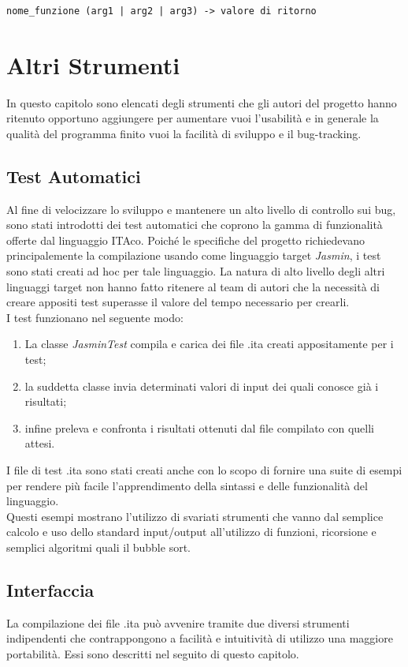 \documentclass[11pt, a4paper, twoside, notitlepage]{report}
\begin{document}
\begin{verbatim}
nome_funzione (arg1 | arg2 | arg3) -> valore di ritorno
\end{verbatim}

\chapter{Altri Strumenti}
In questo capitolo sono elencati degli strumenti che gli autori del progetto
hanno ritenuto opportuno aggiungere per aumentare vuoi l'usabilità e in generale
la qualità del programma finito vuoi la facilità di sviluppo e il bug-tracking.
\section{Test Automatici}
Al fine di velocizzare lo sviluppo e mantenere un alto livello di controllo sui
bug, sono stati introdotti dei test automatici che coprono la gamma di
funzionalità offerte dal linguaggio ITAco. Poiché le specifiche del progetto
richiedevano principalemente la compilazione usando come linguaggio target
\emph{Jasmin}, i test sono stati creati ad hoc per tale linguaggio. La natura di
alto livello degli altri linguaggi target non hanno fatto ritenere al team di
autori che la necessità di creare appositi test superasse il valore del tempo
necessario per crearli.
\\I test funzionano nel seguente modo:
\begin{enumerate}
  \item La classe \emph{JasminTest} compila e carica dei file .ita creati
  appositamente per i test;
  \item la suddetta classe invia determinati valori di input dei quali conosce
  già i risultati;
  \item infine preleva e confronta i risultati ottenuti dal file compilato con
  quelli attesi.
\end{enumerate}
I file di test .ita sono stati creati anche con lo scopo di fornire una suite di
esempi per rendere più facile l'apprendimento della sintassi e delle
funzionalità del linguaggio.
\\Questi esempi mostrano l'utilizzo di svariati strumenti che vanno dal semplice
calcolo e uso dello standard input/output all'utilizzo di funzioni, ricorsione e
semplici algoritmi quali il bubble sort.

\section{Interfaccia}
\label{gui}
La compilazione dei file .ita può avvenire tramite due diversi strumenti
indipendenti che contrappongono a facilità e intuitività di utilizzo una
maggiore portabilità. Essi sono descritti nel seguito di questo capitolo.
\end{document}
